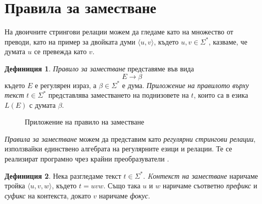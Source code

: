 \documentclass[12pt, oneside]{article}
\theoremstyle{definition}
\newtheorem{definition}{Дефиниция}[section]
\begin{document}
\pagebreak
\section{Правила за заместване}

На двоичните стрингови релации можем да гледаме като на множество от преводи, като на пример за двойката думи \( \langle u, v \rangle \), където \(u,v \in \Sigma^*\), казваме, че думата \( u \) се превежда като \( v \).

\begin{definition}
	\emph{Правило за заместване} представяме във вида
	\[ E \to \beta \]
	където \( E \) е регулярен израз, а \( \beta \in \Sigma^* \) е дума.
	\emph{Приложение на правилото върху текст} \( t \in \Sigma^* \) представлява заместването на поднизовете на \( t \), които са в езика \( L(E) \) с думата \( \beta \).
\end{definition}

\begin{figure}[!htb]
	\centering
	\caption{Приложение на правило на заместване}
\end{figure}

\noindent \emph{Правила за заместване} можем да представим като \emph{регулярни стрингови релации}, използвайки единствено алгебрата на регулярните езици и релации. Те се реализират програмно чрез крайни преобразуватели \cite{Kaplan&Kay:94}.

\begin{definition}
	Нека разгледаме текст \( t \in \Sigma^* \). \emph{Kонтекст на заместване} наричаме тройка \( \langle u,v,w \rangle \), където \( t = uvw \). Също така \( u \) и \( w \) наричаме съответно \emph{префикс} и \emph{суфикс} на контекста, докато \( v \) наричаме \emph{фокус}.
\end{definition}
\end{document}
